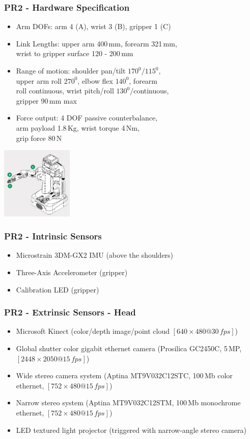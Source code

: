 \begin{frame}
  \frametitle{PR2 - Hardware Specification}
\small{
\begin{itemize}
    \item Arm DOFs: arm 4 (A), wrist 3 (B), gripper 1 (C)
    \item Link Lengths: upper arm 400\,mm, forearm 321\,mm,\\ wrist to gripper surface 120 - 200\,mm
    \item Range of motion: shoulder pan/tilt $170^0/115^0$,\\ upper arm roll $270^0$, elbow flex $140^0$, forearm \\roll continuous, wrist pitch/roll $130^0$/continuous, \\gripper 90\,mm max
    \item Force output: 4 DOF passive counterbalance, \\arm payload 1.8\,Kg, wrist torque 4\,Nm, \\grip force 80\,N
    
\end{itemize}
}
\vspace{-13ex}\hspace{47ex}\includegraphics[width=3.4cm]{images/pr2_arm.png} 
\end{frame}

\begin{frame}
  \frametitle{PR2 - Intrinsic Sensors}
\begin{itemize}
    \item Microstrain 3DM-GX2 IMU (above the shoulders)
    \item Three-Axis Accelerometer (gripper)
    \item Calibration LED (gripper) 
\end{itemize}
\end{frame}

\begin{frame}
  \frametitle{PR2 - Extrinsic Sensors - Head}
\begin{itemize}
    \item Microsoft Kinect (color/depth image/point cloud $[640\times480 @ 30\,fps]$)
    \item Global shutter color gigabit ethernet camera (Prosilica GC2450C, 5\,MP, $[2448\times2050 @ 15\,fps]$)
    \item Wide stereo camera system (Aptina MT9V032C12STC, 100\,Mb color ethernet, $[752\times480@15\,fps]$)
    \item Narrow stereo system (Aptina MT9V032C12STM, 100\,Mb monochrome ethernet, $[752\times480@15\,fps]$)    
    \item LED textured light projector (triggered with narrow-angle stereo camera)
\end{itemize}
\end{frame}

